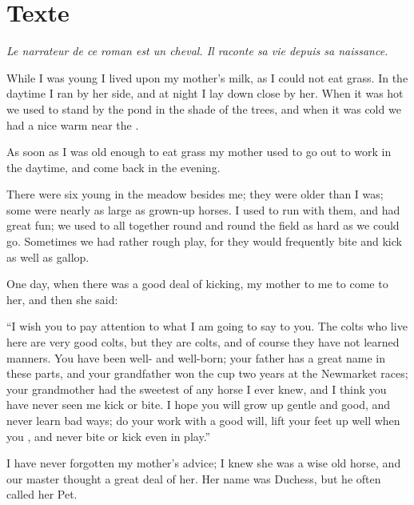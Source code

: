 \documentclass[troisieme]{fiche}
\begin{document}
\newpage
\section{Texte}

\noindent\small\textit{Le narrateur de ce roman est un cheval. Il raconte sa vie depuis sa
naissance.}\normalsize

\begin{texte}
While I was young I lived upon my mother's milk, as I could not eat grass. In the daytime I
ran by her side, and at night I lay down close by her. When it was hot we used to stand by the
pond in the shade of the trees, and when it was cold we had a nice warm
 near the .

As soon as I was old enough to eat grass my mother used to go out to work in the daytime, and
come back in the evening.

There were six young  in the meadow besides me; they were older
than I was; some were nearly as large as grown-up horses. I used to run with them, and had
great fun; we used to  all together round and round the field
as hard as we could go. Sometimes we had rather rough play, for they would frequently bite and
kick as well as gallop.

One day, when there was a good deal of kicking, my mother  to
me to come to her, and then she said:

``I wish you to pay attention to what I am going to say to you. The colts who live here are
very good colts, but they are  colts, and of
course they have not learned manners. You have been well-
and well-born; your father has a great name in these parts, and your grandfather won the cup
two years at the Newmarket races; your grandmother had the sweetest
 of any horse I ever knew, and I think you have never seen
me kick or bite. I hope you will grow up gentle and good, and never learn bad ways; do your
work with a good will, lift your feet up well when you , and never
bite or kick even in play.''

I have never forgotten my mother's advice; I knew she was a wise old horse, and our master
thought a great deal of her. Her name was Duchess, but he often called her Pet.
\end{texte}
\end{document}
